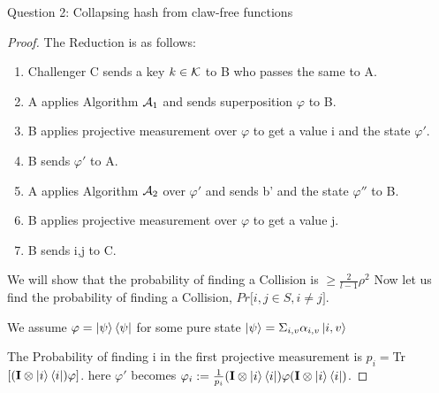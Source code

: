 \begin{solution}{Question 2: Collapsing hash from claw-free functions}
\begin{proof}
    The Reduction is as follows:
    \begin{enumerate}
        \item Challenger C sends a key $k\in \mathcal{K}$ to B who passes the same to A.
        \item A applies Algorithm $\mathcal{A}_1$ and sends superposition $\varphi$ to B.
        \item B applies projective measurement over $\varphi$ to get a value i and the state $\varphi'$.
        \item B sends $\varphi'$ to A.
        \item A applies Algorithm $\mathcal{A}_2$ over $\varphi'$ and sends b' and the state $\varphi''$ to B. 
        \item B applies projective measurement over $\varphi$ to get a value j.
        \item B sends i,j to C.
        
    \end{enumerate}
    We will show that the probability of finding a Collision is $\geq \frac{2}{l-1}\rho^2$
    Now let us find the probability of finding a Collision, $Pr\Bigr[i,j \in S, i\neq j\Bigr]$.\newline

    We assume $\varphi = \ket{\psi}\bra{\psi}$ for some pure state $\ket{\psi} = \Sigma_{i,v}\alpha_{i,v}\ket{i,v}$\newline

    The Probability of finding i in the first projective measurement is $p_i = $Tr$[(\textbf{I}\otimes \ket{i}\bra{i})\varphi ]$. here $\varphi'$ becomes $\varphi_i := \frac{1}{p_i}(\textbf{I}\otimes \ket{i}\bra{i})\varphi(\textbf{I}\otimes \ket{i}\bra{i})$.\newline


\end{proof}
\end{solution}

